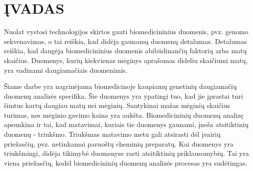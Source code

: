
\newpage
\section*{ĮVADAS}



Nuolat vystosi technologijos skirtos gauti biomedicininius duomenis, pvz. genomo sekvenavimas\cite{pettersson2009generations}, o tai reiškia, kad didėja gaunamų duomenų detalumas. Detalumas reiškia, kad daugėja biomedicininius duomenis abibūdinančių faktorių arba matų skaičius. Duomenys, kurių kiekvienas mėginys aprašomas dideliu skaičiumi matų, yra vadinami daugiamačiais duomenimis.

Šiame darbe yra nagrinėjama biomedicinoje kaupiamų genetinių daugiamačių duomenų analizės specifika. Šie duomenys yra ypatingi tuo, kad jie įprastai turi šimtus kartų daugiau matų nei mėginių. Santykinai mažas mėginių skaičius turimas, nes mėginio gavimo kaina yra aukšta. Biomedicininių duomenų analizę apsunkina ir tai, kad matavimai, kuriais tie duomenys gaunami, įneša atsitiktinių duomenų - triukšmo. Triukšmas matavimo metu gali atsirasti dėl įvairių priežasčių, pvz. netinkamai paruoštų cheminių preparatų. Kai duomenys yra triukšmingi, didėja tikimybė duomenyse rasti atsitiktinių priklausomybių. Tai yra viena priežasčių, kodėl biomedicininių duomenų analizės procesas yra sudėtingas.



